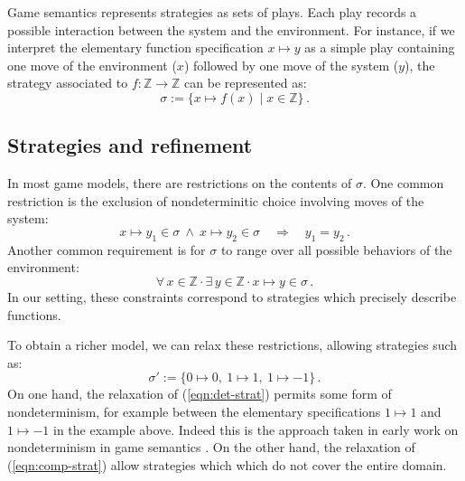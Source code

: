 \documentclass[11pt,oneside,draft]{book}
\theoremstyle{definition}
\newcommand{\bdot}{\boldsymbol{\cdot}}
\begin{document}
Game semantics represents strategies as sets of plays.
Each play records a possible interaction between
the system and the environment.
For instance,
if we interpret the elementary function specification
$x \mapsto y$
as a simple play
containing one move of the environment ($x$)
followed by one move of the system ($y$),
the strategy associated to $f : \mathbb{Z} \rightarrow \mathbb{Z}$
can be represented as:
\[
  \sigma := \{ x \mapsto f(x) \mid x \in \mathbb{Z} \}
  \,.
\]

\subsection{Strategies and refinement} %

In most game models,
there are restrictions on the contents of $\sigma$.
One common restriction is
the exclusion of nondeterminitic choice
involving moves of the system:
\begin{equation}
  x \mapsto y_1 \in \sigma \: \wedge \: x \mapsto y_2 \in \sigma
  \quad \Rightarrow \quad
  y_1 = y_2
  \,.
  \label{eqn:det-strat}
\end{equation}
Another common requirement is
for $\sigma$ to range over all possible behaviors of the environment:
\begin{equation}
  \forall \, x \in \mathbb{Z} \, \bdot \,
  \exists \, y \in \mathbb{Z} \, \bdot \,
  x \mapsto y \in \sigma
  \,.
  \label{eqn:comp-strat}
\end{equation}
In our setting,
these constraints correspond to
strategies which precisely describe functions.

To obtain a richer model,
we can relax these restrictions,
allowing strategies such as:
\[
  \sigma' :=
  \{ 0 \mapsto 0, \: 1 \mapsto 1 , \: 1 \mapsto -1 \}
  \,.
\]
On one hand,
the relaxation of (\ref{eqn:det-strat})
permits some form of nondeterminism,
for example between the elementary specifications
$1 \mapsto 1$ and $1 \mapsto -1$
in the example above.
Indeed this is the approach taken in early work
on nondeterminism in game semantics \citep{gsfnd}.
On the other hand,
the relaxation of (\ref{eqn:comp-strat})
allow strategies which which do not
cover the entire domain.
\end{document}
